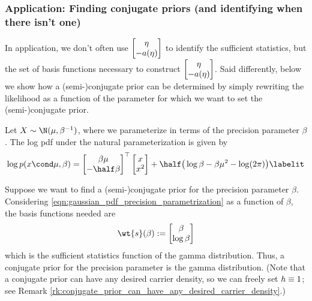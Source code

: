 \subsubsection{Application: Finding conjugate priors (and identifying when there isn't one)}

In application, we don't often use $\begin{bmatrix} 
\eta \\
-a(\eta)
\end{bmatrix}$ to identify the sufficient statistics, but the set of basis functions necessary to construct $\begin{bmatrix} 
\eta \\
-a(\eta)
\end{bmatrix}$. Said differently, below we show how a (semi-)conjugate prior can be determined by simply rewriting the likelihood as a function of the parameter for which we want to set the (semi-)conjugate prior.  

\begin{example}
Let $X \sim \N(\mu, \beta^{-1})$, where we parameterize in terms of the precision parameter $\beta$.  The log pdf under the natural parameterization is given by 
\begin{align*} 
\log p(x \cond \mu, \beta) = 
\begin{bmatrix} 
\beta \mu \\
-\half \beta
\end{bmatrix}^\top 
\begin{bmatrix} 
x \\
x^2
\end{bmatrix} 
+ \half \big(\log \beta - \beta \mu^2 - \log (2 \pi) \big)	
\labelit \label{eqn:gaussian_pdf_precision_parametrization}
\end{align*}

Suppose we want to find a (semi-)conjugate prior for the precision parameter $\beta$.  Considering \eqref{eqn:gaussian_pdf_precision_parametrization} as a function of $\beta$, the basis functions needed are
\[ \wt{\sufficientStatsFunction}(\beta) := 
\begin{bmatrix} 
\beta \\
\log \beta
\end{bmatrix} 
  \]
 which is the sufficient statistics function of the gamma distribution.  Thus, a conjugate prior for the precision parameter is the gamma distribution. (Note that a conjugate prior can have any desired carrier density, so we can freely set $h \equiv 1$; see Remark \ref{rk:conjugate_prior_can_have_any_desired_carrier_density}.)
\end{example}


